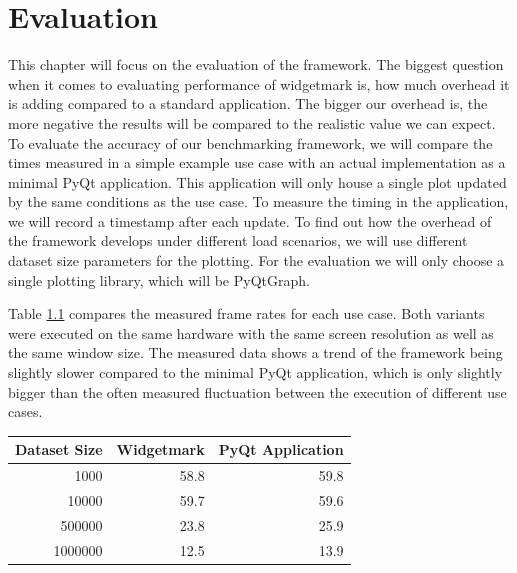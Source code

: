 
\chapter{Evaluation}
\label{ch:Evaluation}

This chapter will focus on the evaluation of the framework. The biggest question
when it comes to evaluating performance of widgetmark is, how much overhead it
is adding compared to a standard application. The bigger our overhead is, the
more negative the results will be compared to the realistic value we can expect.
To evaluate the accuracy of our benchmarking framework, we will compare the
times measured in a simple example use case with an actual implementation as a
minimal PyQt application. This application will only house a single plot updated
by the same conditions as the use case. To measure the timing in the
application, we will record a timestamp after each update. To find out how the
overhead of the framework develops under different load scenarios, we will use
different dataset size parameters for the plotting. For the evaluation we will
only choose a single plotting library, which will be PyQtGraph.

Table \ref{tab:evaluation} compares the measured frame rates for each use case.
Both variants were executed on the same hardware with the same screen resolution
as well as the same window size. The measured data shows a trend of the
framework being slightly slower compared to the minimal PyQt application, which
is only slightly bigger than the often measured fluctuation between the
execution of different use cases.

\begin{table}[h]
\begin{center}

\label{tab:evaluation}

\begin{tabular}{rrr}

\hline
Dataset Size & Widgetmark & PyQt Application \\
\hline
1000         & 58.8       & 59.8             \\
10000        & 59.7       & 59.6             \\
500000       & 23.8       & 25.9             \\
1000000      & 12.5       & 13.9             \\
\hline

\end{tabular}
\end{center}
\end{table}

